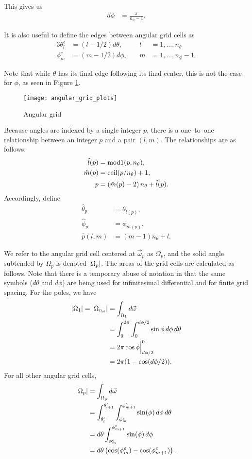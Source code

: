 This gives us
\begin{align*}
  d\phi &= \frac{\pi}{n_\phi-1}.
\end{align*}

It is also useful to define the edges between angular grid cells as
\begin{alignat}{3}
  \theta_l^e &= (l-1/2) d\theta, &\quad l&=1,\ldots,n_\theta \\
  \phi_m^e &= (m-1/2) d\phi, &\quad m&=1,\ldots,n_\phi-1.
\end{alignat}

Note that while $\theta$ has its final edge following its final center, this is
not the case for $\phi$, as seen in Figure \ref{fig:angular_grid_plots}.

\begin{figure}[h]
  \centering
  \texttt{[image: angular\_grid\_plots]}
  \caption{Angular grid}
  \label{fig:angular_grid_plots}
\end{figure}

Because angles are indexed by a single integer $p$, there is a one--to--one relationship between
an integer $p$ and a pair $(l,m)$.
The relationships are as follows:
\begin{align*}
  \hat{l}(p) &= \mbox{mod1}(p, n_\theta), \\
  \hat{m}(p) &= \mbox{ceil}(p/n_\theta) + 1, \\
  p &= \left( \hat{m}(p)-2\right)n_\theta + \hat{l}(p).
\end{align*}
Accordingly, define
\begin{align*}
  \hat{\theta}_p &= \theta_{\hat{l}(p)}, \\
  \hat{\phi}_p &= \phi_{\hat{m}(p)}, \\
  \hat{p}(l,m) &= (m-1)n_\theta + l.
\end{align*}

We refer to the angular grid cell centered at $\vec{\omega}_p$ as $\Omega_p$, and the solid angle subtended by $\Omega_p$ is denoted $\left| \Omega_p \right|$.
The areas of the grid cells are calculated as follows.
Note that there is a temporary abuse of notation in that the same symbols ($d\theta$ and $d\phi$) are being used for infinitesimal differential and for finite grid spacing.
For the poles, we have
\begin{align*}
  \left| \Omega_1 \right| = \left| \Omega_{n_{\vec{\omega}}} \right| &= \int_{\Omega_1} d{\vec{\omega}} \\
  &= \int_0^{2\pi}\int_0^{d\phi/2} \sin\phi\, d\phi\, d\theta \\
  &= 2\pi \cos\phi \Big|_{d\phi/2}^0 \\
  &= 2\pi(1-\cos(d\phi/2)).
\end{align*}
For all other angular grid cells,
\begin{align*}
  \left| \Omega_p \right| &= \int_{\Omega_p} d{\vec{\omega}} \\
                 &= \int_{\theta_l^e}^{\theta_{l+1}^e}\int_{\phi_m^e}^{\phi_{m+1}^e} \sin(\phi)\, d\phi\, d\theta \\
                 &= d\theta \int_{\phi_m^e}^{\phi_{m+1}^e} \sin(\phi)\, d\phi \\
                 &= d\theta\left( \cos(\phi_m^e)-\cos(\phi_{m+1}^e) \right).
\end{align*}
